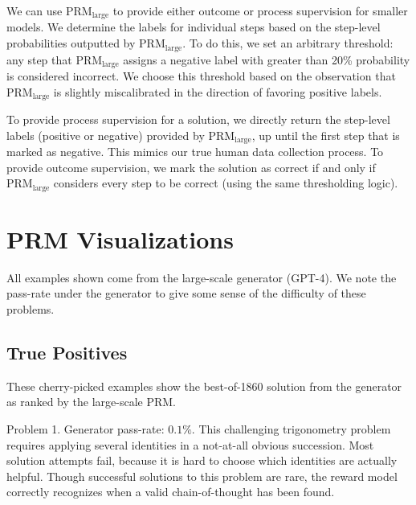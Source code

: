 \documentclass{article}
\begin{document}
We can use $\text{PRM}_{\text{large}}$ to provide either outcome or process supervision for smaller models. We determine the labels for individual steps based on the step-level probabilities outputted by $\text{PRM}_{\text{large}}$. To do this, we set an arbitrary threshold: any step that $\text{PRM}_{\text{large}}$ assigns a negative label with greater than 20\% probability is considered incorrect. We choose this threshold based on the observation that $\text{PRM}_{\text{large}}$ is slightly miscalibrated in the direction of favoring positive labels.

To provide process supervision for a solution, we directly return the step-level labels (positive or negative) provided by $\text{PRM}_{\text{large}}$, up until the first step that is marked as negative. This mimics our true human data collection process. To provide outcome supervision, we mark the solution as correct if and only if $\text{PRM}_{\text{large}}$ considers every step to be correct (using the same thresholding logic).

\newpage

\section{PRM Visualizations} \label{appendix:prm_visualizations}

All examples shown come from the large-scale generator (GPT-4). We note the pass-rate under the generator to give some sense of the difficulty of these problems.

\subsection{True Positives}

These cherry-picked examples show the best-of-1860 solution from the generator as ranked by the large-scale PRM.

\vspace{.5cm}

\noindent
Problem 1. Generator pass-rate: $0.1\%$. This challenging trigonometry problem requires applying several identities in a not-at-all obvious succession. Most solution attempts fail, because it is hard to choose which identities are actually helpful. Though successful solutions to this problem are rare, the reward model correctly recognizes when a valid chain-of-thought has been found.

\vspace{.25cm}
\end{document}
